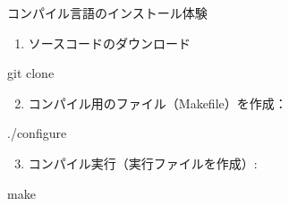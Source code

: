 \documentclass[
  ignorenonframetext,
]{beamer}
\newenvironment{Shaded}{\begin{snugshade}}{\end{snugshade}}
\newcommand{\ExtensionTok}[1]{\textcolor[rgb]{0.00,0.23,0.31}{#1}}
\newcommand{\FunctionTok}[1]{\textcolor[rgb]{0.28,0.35,0.67}{#1}}
\newcommand{\NormalTok}[1]{\textcolor[rgb]{0.00,0.23,0.31}{#1}}
\providecommand{\tightlist}{%
  \setlength{\itemsep}{0pt}\setlength{\parskip}{0pt}}\usepackage{longtable,booktabs,array}
\begin{document}
\begin{frame}[fragile]{コンパイル言語のインストール体験}
\protect\hypertarget{ux30b3ux30f3ux30d1ux30a4ux30ebux8a00ux8a9eux306eux30a4ux30f3ux30b9ux30c8ux30fcux30ebux4f53ux9a13}{}
\begin{enumerate}[<+->]
\tightlist
\item
  ソースコードのダウンロード
\end{enumerate}

\begin{Shaded}
\begin{Highlighting}[]
\FunctionTok{git}\NormalTok{ clone}
\end{Highlighting}
\end{Shaded}

\begin{enumerate}[<+->]
\setcounter{enumi}{1}
\tightlist
\item
  コンパイル用のファイル（Makefile）を作成：\\
\end{enumerate}

\begin{Shaded}
\begin{Highlighting}[]
\ExtensionTok{./configure}
\end{Highlighting}
\end{Shaded}

\begin{enumerate}[<+->]
\setcounter{enumi}{2}
\tightlist
\item
  コンパイル実行（実行ファイルを作成）:\\
\end{enumerate}

\begin{Shaded}
\begin{Highlighting}[]
\FunctionTok{make}
\end{Highlighting}
\end{Shaded}
\end{frame}
\end{document}
